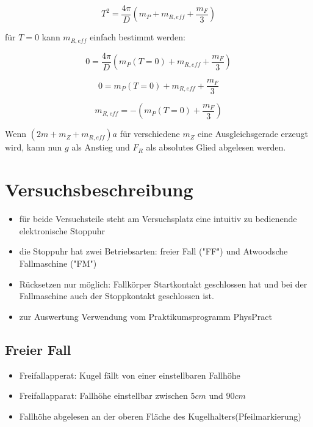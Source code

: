 \documentclass{protokoll}
\begin{document}
\begin{equation}
 T^2 = \frac{4 \pi}{D} (m_P + m_{R,eff} + \frac{m_F}{3}) 
\end{equation}




für $T=0$ kann $m_{R,eff}$ einfach bestimmt werden:


\begin{equation}
 0 = \frac{4 \pi}{D} (m_P(T=0) + m_{R,eff} + \frac{m_F}{3}) 
\end{equation}


\begin{equation}
 0 = m_P(T=0) + m_{R,eff} + \frac{m_F}{3} 
\end{equation}


\begin{equation}
 m_{R,eff} = -(m_P(T=0) + \frac{m_F}{3}) 
\end{equation}




Wenn $(2m + m_Z + m_{R,eff})a$ für verschiedene $m_Z$ eine Ausgleichsgerade erzeugt wird,
kann nun $g$ als Anstieg und $F_R$ als absolutes Glied abgelesen werden.



\section{Versuchsbeschreibung}
\begin{itemize}

\item für beide Versuchsteile steht am Versuchsplatz eine 
intuitiv zu bedienende elektronische Stoppuhr
\item die Stoppuhr hat zwei Betriebsarten: freier Fall ("FF") 
und Atwoodsche Fallmaschine ("FM")
\item Rücksetzen nur möglich: Fallkörper Startkontakt geschlossen 
hat und bei der Fallmaschine auch der Stoppkontakt geschlossen ist.
\item zur Auswertung Verwendung vom Praktikumsprogramm PhysPract

\end{itemize}


\subsection{Freier Fall}
\begin{itemize}

\item Freifallapperat: Kugel fällt von einer einstellbaren Fallhöhe
\item Freifallapparat: Fallhöhe einstellbar zwischen $5cm$  und $90cm$
\item Fallhöhe abgelesen an der oberen Fläche des Kugelhalters(Pfeilmarkierung)

\end{itemize}
\end{document}

